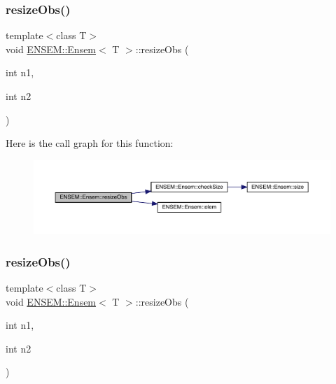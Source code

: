 \subsubsection{\texorpdfstring{resizeObs()}{resizeObs()}\hspace{0.1cm}{\footnotesize\ttfamily [3/8]}}
{\footnotesize\ttfamily template$<$class T$>$ \\
void \mbox{\hyperlink{classENSEM_1_1Ensem}{E\+N\+S\+E\+M\+::\+Ensem}}$<$ T $>$\+::resize\+Obs (\begin{DoxyParamCaption}\item[{int}]{n1,  }\item[{int}]{n2 }\end{DoxyParamCaption})\hspace{0.3cm}{\ttfamily [inline]}}

Here is the call graph for this function\+:
\nopagebreak
\begin{figure}[H]
\begin{center}
\leavevmode
\includegraphics[width=350pt]{d7/d3e/classENSEM_1_1Ensem_af74074307267e421a53a3e9e9e2449fc_cgraph}
\end{center}
\end{figure}
\mbox{\label{classENSEM_1_1Ensem_af74074307267e421a53a3e9e9e2449fc}} 
\subsubsection{\texorpdfstring{resizeObs()}{resizeObs()}\hspace{0.1cm}{\footnotesize\ttfamily [4/8]}}
{\footnotesize\ttfamily template$<$class T$>$ \\
void \mbox{\hyperlink{classENSEM_1_1Ensem}{E\+N\+S\+E\+M\+::\+Ensem}}$<$ T $>$\+::resize\+Obs (\begin{DoxyParamCaption}\item[{int}]{n1,  }\item[{int}]{n2 }\end{DoxyParamCaption})\hspace{0.3cm}{\ttfamily [inline]}}

